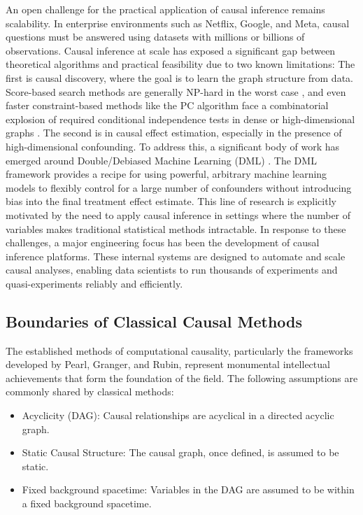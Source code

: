 {An open challenge for the practical application of causal inference remains scalability. In enterprise environments such as Netflix, Google, and Meta, causal questions must be answered using datasets with millions or billions of observations. Causal inference at scale has exposed a significant gap between theoretical algorithms and practical feasibility due to two known limitations:
\newline
The first is causal discovery, where the goal is to learn the graph structure from data. Score-based search methods are generally NP-hard in the worst case \cite{Chickering2002Optimal}, and even faster constraint-based methods like the PC algorithm face a combinatorial explosion of required conditional independence tests in dense or high-dimensional graphs \cite{Kalisch2007Estimating}.
\newline
 The second is in causal effect estimation, especially in the presence of high-dimensional confounding. To address this, a significant body of work has emerged around Double/Debiased Machine Learning (DML) \cite{Chernozhukov2018Double}. The DML framework provides a recipe for using powerful, arbitrary machine learning models to flexibly control for a large number of confounders without introducing bias into the final treatment effect estimate. This line of research is explicitly motivated by the need to apply causal inference in settings where the number of variables makes traditional statistical methods intractable.
 In response to these challenges, a major engineering focus has been the development of causal inference platforms. These internal systems are designed to automate and scale causal analyses, enabling data scientists to run thousands of experiments and quasi-experiments reliably and efficiently.
 
 
\subsection{Boundaries of Classical Causal Methods}

The established methods of computational causality, particularly the frameworks developed by Pearl, Granger, and Rubin, represent monumental intellectual achievements that form the foundation of the field. The following assumptions are commonly shared by classical methods:

\begin{itemize}
    \item Acyclicity (DAG): Causal relationships are acyclical in a directed acyclic graph.
    \item Static Causal Structure: The causal graph, once defined, is assumed to be static.
    \item Fixed background spacetime: Variables in the DAG are assumed to be within a fixed background spacetime.
\end{itemize}

}
